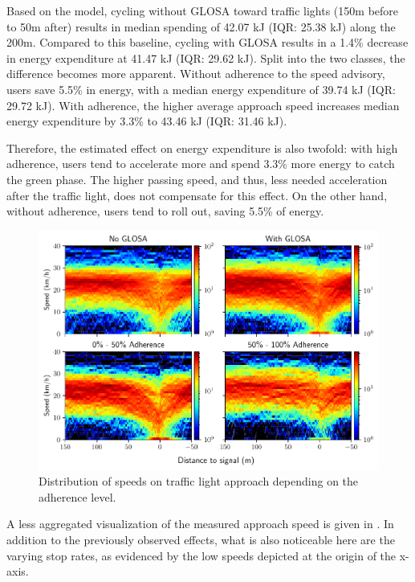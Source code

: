 Based on the model, cycling without GLOSA toward traffic lights (150m before to 50m after) results in median spending of 42.07 kJ (IQR: 25.38 kJ) along the 200m. Compared to this baseline, cycling with GLOSA results in a 1.4\% decrease in energy expenditure at 41.47 kJ (IQR: 29.62 kJ). Split into the two classes, the difference becomes more apparent. Without adherence to the speed advisory, users save 5.5\% in energy, with a median energy expenditure of 39.74 kJ (IQR: 29.72 kJ). With adherence, the higher average approach speed increases median energy expenditure by 3.3\% to 43.46 kJ (IQR: 31.46 kJ). 

Therefore, the estimated effect on energy expenditure is also twofold: with high adherence, users tend to accelerate more and spend 3.3\% more energy to catch the green phase. The higher passing speed, and thus, less needed acceleration after the traffic light, does not compensate for this effect. On the other hand, without adherence, users tend to roll out, saving 5.5\% of energy.

\begin{figure}[t]
\caption{Distribution of speeds on traffic light approach depending on the adherence level.}\label{fig:impacts-approach-speed-heatmap}
\includegraphics[width=\linewidth]{images/impacts-approach-speed-heatmap.pdf}
\end{figure}

A less aggregated visualization of the measured approach speed is given in . In addition to the previously observed effects, what is also noticeable here are the varying stop rates, as evidenced by the low speeds depicted at the origin of the x-axis. 


